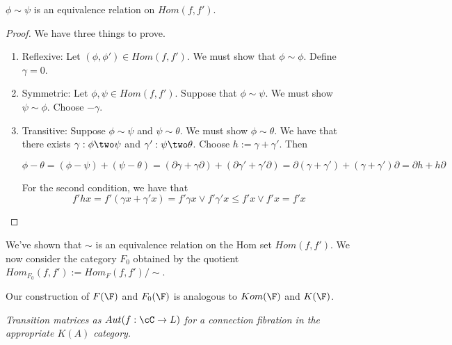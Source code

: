 \begin{prop}
 $\phi \sim \psi$ is an equivalence relation on $Hom(f,f')$.
\end{prop}
\begin{proof}
We have three things to prove.

\begin{enumerate}
\item Reflexive: Let $(\phi,\phi') \in Hom(f,f')$. We must show that $\phi\sim \phi$.  Define $\gamma=0$.

\item Symmetric:  Let $\phi, \psi \in Hom(f,f')$.  Suppose that $\phi\sim \psi$.  We must show $\psi\sim \phi$.  Choose $-\gamma$.

\item Transitive: Suppose $\phi\sim \psi$ and $\psi \sim \theta$.  We must show $\phi\sim \theta$.  We have that there exists $\gamma:\phi \two \psi$ and $\gamma':\psi \two \theta$.  Choose $h:= \gamma+\gamma'$.  Then 

$$\phi - \theta = (\phi-\psi)+(\psi-\theta) = (\partial\gamma + \gamma\partial) + (\partial\gamma'+\gamma'\partial) = \partial(\gamma+\gamma')+(\gamma+\gamma')\partial = \partial h + h \partial$$

For the second condition, we have that $$f'hx = f'(\gamma x+\gamma' x) = f'\gamma x \vee f'\gamma' x \leq f'x \vee f' x = f'x$$

\end{enumerate}
\end{proof}


We've shown that $\sim$ is an equivalence relation on the Hom set $Hom(f,f')$.    We now consider the category $F_0$ obtained by the quotient $Hom_{F_0}(f,f') := Hom_F(f,f')/\sim$.

Our construction of $F(\F)$ and $F_0(\F)$ is analogous to $Kom(\F)$ and $K(\F)$.

%
%

\begin{rem}
{\em
{\em Transition matrices} as $Aut(f:\cC\to L)$ for a connection fibration in the appropriate $K(A)$ category.
}
\end{rem}



